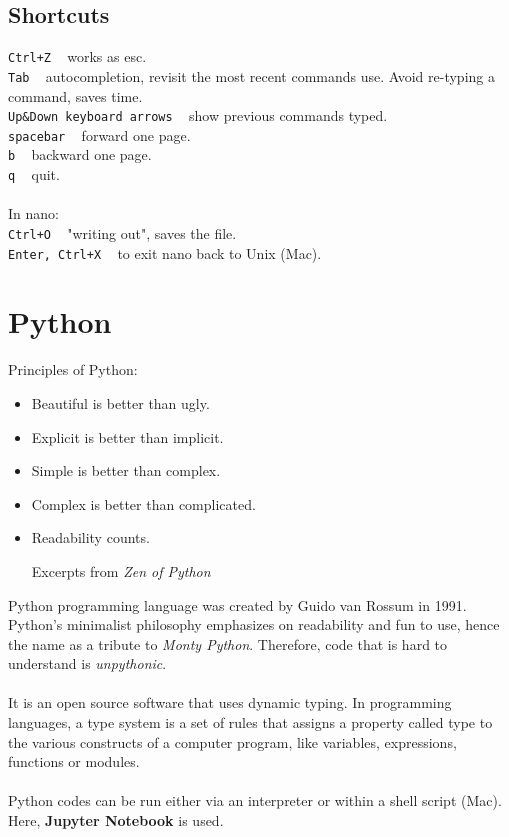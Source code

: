\documentclass{article}
\begin{document}
\subsection{\textbf{Shortcuts}}
\texttt{Ctrl+Z} ~ works as esc.\\
\texttt{Tab}	 ~	autocompletion, revisit the most recent commands use. Avoid re-typing a command, saves time.\\
\texttt{Up\&Down keyboard arrows} ~ show previous commands typed.\\
\texttt{spacebar} ~	forward one page.\\
\texttt{b} ~	 backward one page.\\
\texttt{q} ~	 quit.\\
\\
In nano:\\
\indent
\texttt{Ctrl+O} ~ "writing out", saves the file. \\
\indent
\texttt{Enter, Ctrl+X} ~ to exit nano back to Unix (Mac).\\

\newpage
\section{Python}


Principles of Python:
\begin{itemize}
\item[]Beautiful is better than ugly.
\item[]Explicit is better than implicit.
\item[]Simple is better than complex.
\item[]Complex is better than complicated.
\item[]Readability counts.

\hfill Excerpts from \textit{Zen of Python} 
\end{itemize}

Python programming language was created by Guido van Rossum in 1991. Python's minimalist philosophy emphasizes on readability and fun to use, hence the name as a tribute to \textit{Monty Python}. Therefore, code that is hard to understand is \textit{unpythonic}.\\
\\
 It is an open source software that uses dynamic typing. In programming languages, a type system is a set of rules that assigns a property called type to the various constructs of a computer program, like variables, expressions, functions or modules. \\
\\
 Python codes can be run either via an interpreter or within a shell script (Mac). Here, \textbf{Jupyter Notebook} is used. 
\end{document}

